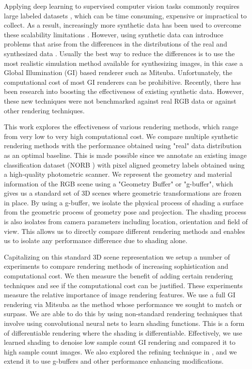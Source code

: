 \documentclass[10pt,twocolumn,letterpaper]{article}
\begin{document}
Applying deep learning to supervised computer vision tasks commonly requires large labeled datasets \cite{imagenet, coco}, which can be time consuming, expensive or impractical to collect. As a result, increasingly more synthetic data has been used to overcome these scalability limitations \cite{DBLP:journals/corr/RichterVRK16, DBLP:journals/corr/ShafaeiLS16, DBLP:journals/corr/ZhangSYSLJF16, DBLP:journals/corr/SixtWL17}. However, using synthetic data can introduce problems that arise from the differences in the distributions of the real and synthesized data \cite{2014arXiv1409.7495G}. Usually the best way to reduce the differences is to use the most realistic simulation method available for synthesizing images, in this case a Global Illumination (GI) based renderer such as Mitsuba\cite{Mitsuba}.  Unfortunately, the computational cost of most GI renderers can be prohibitive.  Recently, there has been research into boosting the effectiveness of existing synthetic data\cite{DBLP:journals/corr/ShrivastavaPTSW16}.  However, these new techniques were not benchmarked against real RGB data or against other rendering techniques.

This work explores the effectiveness of various rendering methods, which range from very low to very high computational cost. We compare multiple synthetic rendering methods with the performance obtained using "real" data distribution as an optimal baseline. This is made possible since we annotate an existing image classification dataset (NORB \cite{LeCun:2004:LMG:1896300.1896315}) with pixel aligned geometry labels obtained using a high-quality photometric scanner. We represent the geometry and material information of the RGB scene using a "Geometry Buffer" or "g-buffer", which gives us a standard set of 3D scenes where geometric transformations are frozen in place. By using a g-buffer, we isolate the physical process of shading a surface from the geometric process of geometry pose and projection.  The shading process is also isolates from camera parameters including location, orientation and field of view. This allows us to directly compare different rendering methods and enables us to isolate any performance difference due to shading alone.

Capitalizing on this standard 3D scene representation we setup a number of experiments to compare rendering methods of increasing sophistication and computational cost.  We then measure the benefit of adding certain rendering techniques and see if the computational cost can be justified.  These experiments measure the relative importance of image rendering features. We use a full GI rendering via Mitsuba as the method whose performance we sought to match or surpass.
We are able to do this by using non-standard rendering techniques that involve using convolutional neural nets to learn shading functions.  This is a form of differentiable rendering where the shading is differentiable. Effectively, we use learned shading to denoise low sample count GI rendering and compared it to high sample count images.  We also explored the refining technique in \cite{DBLP:journals/corr/ShrivastavaPTSW16}, and we extend it to use g-buffers and other performance enhancing modifications.
\end{document}
